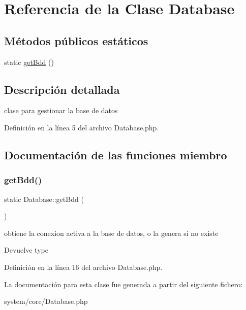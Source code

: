 \hypertarget{class_database}{}\section{Referencia de la Clase Database}
\label{class_database}
\subsection*{Métodos públicos estáticos}
\begin{DoxyCompactItemize}
\item 
static \mbox{\hyperlink{class_database_aa9a1dcc0705102af94199c656a3086ce}{get\+Bdd}} ()
\end{DoxyCompactItemize}


\subsection{Descripción detallada}
clase para gestionar la base de datos 

Definición en la línea 5 del archivo Database.\+php.



\subsection{Documentación de las funciones miembro}
\mbox{\label{class_database_aa9a1dcc0705102af94199c656a3086ce}} 
\subsubsection{\texorpdfstring{getBdd()}{getBdd()}}
{\footnotesize\ttfamily static Database\+::get\+Bdd (\begin{DoxyParamCaption}{ }\end{DoxyParamCaption})\hspace{0.3cm}{\ttfamily [static]}}

obtiene la conexion activa a la base de datos, o la genera si no existe

\begin{DoxyReturn}{Devuelve}
type 
\end{DoxyReturn}


Definición en la línea 16 del archivo Database.\+php.



La documentación para esta clase fue generada a partir del siguiente fichero\+:\begin{DoxyCompactItemize}
\item 
system/core/Database.\+php\end{DoxyCompactItemize}

